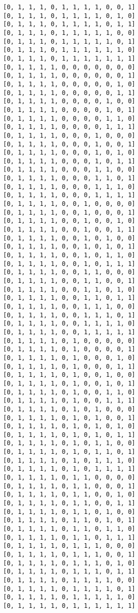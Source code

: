 \documentclass[11pt]{article}
\begin{document}
\begin{Verbatim}[commandchars=\\\{\}]
[0, 1, 1, 1, 0, 1, 1, 1, 1, 0, 0, 1]
[0, 1, 1, 1, 0, 1, 1, 1, 1, 0, 1, 0]
[0, 1, 1, 1, 0, 1, 1, 1, 1, 0, 1, 1]
[0, 1, 1, 1, 0, 1, 1, 1, 1, 1, 0, 0]
[0, 1, 1, 1, 0, 1, 1, 1, 1, 1, 0, 1]
[0, 1, 1, 1, 0, 1, 1, 1, 1, 1, 1, 0]
[0, 1, 1, 1, 0, 1, 1, 1, 1, 1, 1, 1]
[0, 1, 1, 1, 1, 0, 0, 0, 0, 0, 0, 0]
[0, 1, 1, 1, 1, 0, 0, 0, 0, 0, 0, 1]
[0, 1, 1, 1, 1, 0, 0, 0, 0, 0, 1, 0]
[0, 1, 1, 1, 1, 0, 0, 0, 0, 0, 1, 1]
[0, 1, 1, 1, 1, 0, 0, 0, 0, 1, 0, 0]
[0, 1, 1, 1, 1, 0, 0, 0, 0, 1, 0, 1]
[0, 1, 1, 1, 1, 0, 0, 0, 0, 1, 1, 0]
[0, 1, 1, 1, 1, 0, 0, 0, 0, 1, 1, 1]
[0, 1, 1, 1, 1, 0, 0, 0, 1, 0, 0, 0]
[0, 1, 1, 1, 1, 0, 0, 0, 1, 0, 0, 1]
[0, 1, 1, 1, 1, 0, 0, 0, 1, 0, 1, 0]
[0, 1, 1, 1, 1, 0, 0, 0, 1, 0, 1, 1]
[0, 1, 1, 1, 1, 0, 0, 0, 1, 1, 0, 0]
[0, 1, 1, 1, 1, 0, 0, 0, 1, 1, 0, 1]
[0, 1, 1, 1, 1, 0, 0, 0, 1, 1, 1, 0]
[0, 1, 1, 1, 1, 0, 0, 0, 1, 1, 1, 1]
[0, 1, 1, 1, 1, 0, 0, 1, 0, 0, 0, 0]
[0, 1, 1, 1, 1, 0, 0, 1, 0, 0, 0, 1]
[0, 1, 1, 1, 1, 0, 0, 1, 0, 0, 1, 0]
[0, 1, 1, 1, 1, 0, 0, 1, 0, 0, 1, 1]
[0, 1, 1, 1, 1, 0, 0, 1, 0, 1, 0, 0]
[0, 1, 1, 1, 1, 0, 0, 1, 0, 1, 0, 1]
[0, 1, 1, 1, 1, 0, 0, 1, 0, 1, 1, 0]
[0, 1, 1, 1, 1, 0, 0, 1, 0, 1, 1, 1]
[0, 1, 1, 1, 1, 0, 0, 1, 1, 0, 0, 0]
[0, 1, 1, 1, 1, 0, 0, 1, 1, 0, 0, 1]
[0, 1, 1, 1, 1, 0, 0, 1, 1, 0, 1, 0]
[0, 1, 1, 1, 1, 0, 0, 1, 1, 0, 1, 1]
[0, 1, 1, 1, 1, 0, 0, 1, 1, 1, 0, 0]
[0, 1, 1, 1, 1, 0, 0, 1, 1, 1, 0, 1]
[0, 1, 1, 1, 1, 0, 0, 1, 1, 1, 1, 0]
[0, 1, 1, 1, 1, 0, 0, 1, 1, 1, 1, 1]
[0, 1, 1, 1, 1, 0, 1, 0, 0, 0, 0, 0]
[0, 1, 1, 1, 1, 0, 1, 0, 0, 0, 0, 1]
[0, 1, 1, 1, 1, 0, 1, 0, 0, 0, 1, 0]
[0, 1, 1, 1, 1, 0, 1, 0, 0, 0, 1, 1]
[0, 1, 1, 1, 1, 0, 1, 0, 0, 1, 0, 0]
[0, 1, 1, 1, 1, 0, 1, 0, 0, 1, 0, 1]
[0, 1, 1, 1, 1, 0, 1, 0, 0, 1, 1, 0]
[0, 1, 1, 1, 1, 0, 1, 0, 0, 1, 1, 1]
[0, 1, 1, 1, 1, 0, 1, 0, 1, 0, 0, 0]
[0, 1, 1, 1, 1, 0, 1, 0, 1, 0, 0, 1]
[0, 1, 1, 1, 1, 0, 1, 0, 1, 0, 1, 0]
[0, 1, 1, 1, 1, 0, 1, 0, 1, 0, 1, 1]
[0, 1, 1, 1, 1, 0, 1, 0, 1, 1, 0, 0]
[0, 1, 1, 1, 1, 0, 1, 0, 1, 1, 0, 1]
[0, 1, 1, 1, 1, 0, 1, 0, 1, 1, 1, 0]
[0, 1, 1, 1, 1, 0, 1, 0, 1, 1, 1, 1]
[0, 1, 1, 1, 1, 0, 1, 1, 0, 0, 0, 0]
[0, 1, 1, 1, 1, 0, 1, 1, 0, 0, 0, 1]
[0, 1, 1, 1, 1, 0, 1, 1, 0, 0, 1, 0]
[0, 1, 1, 1, 1, 0, 1, 1, 0, 0, 1, 1]
[0, 1, 1, 1, 1, 0, 1, 1, 0, 1, 0, 0]
[0, 1, 1, 1, 1, 0, 1, 1, 0, 1, 0, 1]
[0, 1, 1, 1, 1, 0, 1, 1, 0, 1, 1, 0]
[0, 1, 1, 1, 1, 0, 1, 1, 0, 1, 1, 1]
[0, 1, 1, 1, 1, 0, 1, 1, 1, 0, 0, 0]
[0, 1, 1, 1, 1, 0, 1, 1, 1, 0, 0, 1]
[0, 1, 1, 1, 1, 0, 1, 1, 1, 0, 1, 0]
[0, 1, 1, 1, 1, 0, 1, 1, 1, 0, 1, 1]
[0, 1, 1, 1, 1, 0, 1, 1, 1, 1, 0, 0]
[0, 1, 1, 1, 1, 0, 1, 1, 1, 1, 0, 1]
[0, 1, 1, 1, 1, 0, 1, 1, 1, 1, 1, 0]
[0, 1, 1, 1, 1, 0, 1, 1, 1, 1, 1, 1]

\end{Verbatim}
\end{document}
